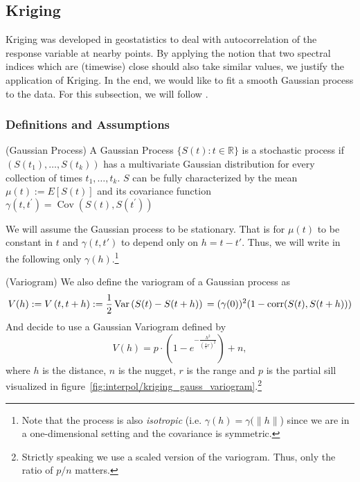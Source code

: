 	\subsection{Kriging}
		\label{sec:Kriging}

		Kriging was developed in geostatistics to deal with autocorrelation of the response variable at nearby points. By applying the notion that two spectral indices which are (timewise) close should also take similar values, we justify the application of Kriging. In the end, we would like to fit a smooth Gaussian process to the data. For this subsection, we will follow \cite{diggleGaussianModelsGeostatistical2007}.

		\subsubsection*{Definitions and Assumptions}

			\begin{definition}(Gaussian Process)
				A Gaussian Process $\{S(t) : t\in \mathbb R\} $ is a stochastic process if $(S(t_1),\dots,S(t_k))$ has a multivariate Gaussian distribution for every collection of times ${t_1, \dots , t_k}$.
				$S$ can be fully characterized by the mean $\mu(t):=E[S(t)]$ and its covariance function $\gamma\left(t, t^{\prime}\right)=\operatorname{Cov}\left(S(t), S\left(t^{\prime}\right)\right)$
			\end{definition}

			\begin{assumption}{1}
				\label{ass:kriging_stationary}
				We will assume the Gaussian process to be stationary. That is for $\mu(t)$ to be constant in $t$ and $\gamma(t,t')$ to depend only on $h=t-t'$. Thus, we will write in the following only $\gamma(h)$.\footnote{Note that the process is also \textit{isotropic} (i.e. $\gamma(h)=\gamma(\|h\|$) since we are in a one-dimensional setting and the covariance is symmetric.}
			\end{assumption}

			\begin{definition}(Variogram)
				We also define the variogram of a Gaussian process as
				$$V(h):=V\left(t, t+h\right):=\frac{1}{2} \operatorname{Var}\left(S(t)-S(t+h)\right)\\ %
					=(\gamma(0))^2(1-\operatorname{corr}(S(t),S(t+h)))
				$$
				And decide to use a Gaussian Variogram defined by
				$$V(h) = p \cdot\left(1-e^{-\frac{h^{2}}{\left(\frac{4}{7} r\right)^{2}}}\right)+n,$$
				where $h$ is the distance, $n$ is the nugget, $r$ is the range and $p$ is the partial sill visualized in figure~\ref{fig:interpol/kriging_gauss_variogram}.\footnote{Strictly speaking we use a scaled version of the variogram. Thus, only the ratio of $p/n$ matters.}
			\end{definition}

